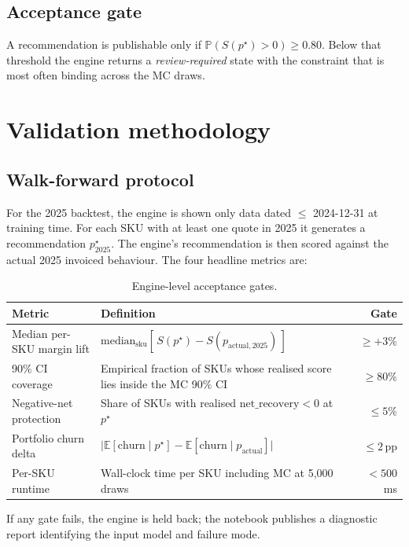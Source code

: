 \documentclass[11pt,a4paper]{article}
\newcommand{\E}{\mathbb{E}}
\newcommand{\Prob}{\mathbb{P}}
\newcommand{\sku}{\mathrm{sku}}
\begin{document}
\subsection{Acceptance gate}
A recommendation is publishable only if $\Prob(S(p^\star) > 0) \geq 0.80$. Below that threshold the engine returns a \emph{review-required} state with the constraint that is most often binding across the MC draws.

\section{Validation methodology}

\subsection{Walk-forward protocol}
For the 2025 backtest, the engine is shown only data dated $\leq$ 2024-12-31 at training time. For each SKU with at least one quote in 2025 it generates a recommendation $p^\star_{2025}$. The engine's recommendation is then scored against the actual 2025 invoiced behaviour. The four headline metrics are:

\begin{table}[ht]
\centering
\small
\caption{Engine-level acceptance gates.}
\label{tab:gates}
\begin{tabularx}{0.96\textwidth}{lXr}
\toprule
\textbf{Metric} & \textbf{Definition} & \textbf{Gate} \\
\midrule
Median per-SKU margin lift & $\text{median}_{\sku} [\, S(p^\star) - S(p_{\text{actual},2025}) \,]$ & $\geq +3\%$ \\
90\% CI coverage & Empirical fraction of SKUs whose realised score lies inside the MC 90\% CI & $\geq 80\%$ \\
Negative-net protection & Share of SKUs with realised $\text{net\_recovery} < 0$ at $p^\star$ & $\leq 5\%$ \\
Portfolio churn delta & $\bigl| \E[\text{churn} \mid p^\star] - \E[\text{churn} \mid p_{\text{actual}}] \bigr|$ & $\leq 2\,$pp \\
Per-SKU runtime & Wall-clock time per SKU including MC at 5,000 draws & $<500$ ms \\
\bottomrule
\end{tabularx}
\end{table}

If any gate fails, the engine is held back; the notebook publishes a diagnostic report identifying the input model and failure mode.
\end{document}
